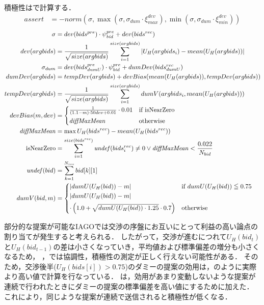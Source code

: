 積極性はで計算する．
\begin{align}
    assert &= -norm \left(\sigma, \max \left(\sigma, \sigma_{dum} \cdot \xi_{max}^{dev}\right), \min \left(\sigma, \sigma_{dum} \cdot \xi_{min}^{dev}\right) \right) \label{eq:assertiveness} 
\end{align}
\begin{align}
    \sigma &= dev(bids^{pre}) \cdot \psi_{\mathit{bid}}^{pre} + dev(bids^{rec}) \nonumber \\
    dev(argbids) &= \frac{1}{\sqrt{size(argbids)}}\sum_{i = 1}^{size(argbids)} |U_H(argbids_i) - mean(U_H(argbids))| \nonumber \\
    \sigma_{dum} &= dev(bids_{dumU}^{pre}) \cdot \psi_{\mathit{bid}}^{pre} + dumDev(bids_{dumU}^{rec}) \nonumber \\
    dumDev(argbids) &= tempDev(argbids) + devBias(mean(U_H(argbids)), tempDev(argbids)) \nonumber \\
    tempDev(argbids) &= \frac{1}{\sqrt{size(argbids)}}\sum_{i = 1}^{size(argbids)} dumV(argbids_i, mean(U_H(argbids))) \nonumber \\
    devBias(m, dev) &= 
    \begin{cases*}
        \frac{1}{(1.1 - m) \cdot 50dev + 0.01} \cdot 0.01 & if isNearZero \\
        \mathit{diffMaxMean} & otherwise 
    \end{cases*} \label{eq:devBias} \\
    \mathit{diffMaxMean} &= \max U_H(bids^{rec}) - mean(U_H(bids^{rec})) \nonumber \\
    {\rm isNearZero} &= \sum_{i = 1}^{size(bids^{rec})}\mathit{undef}(bids^{rec}_i) \neq 0 \vee \mathit{diffMaxMean} < \frac{0.022}{N_{bid}} \nonumber \\
    \mathit{undef}(bid) &= \sum_{k = 1}^{N_{iss}} bid[k][1] \nonumber \\
    dumV(bid, m) &=
    \begin{cases*}
        |dumU(U_H(bid)) - m| & if $dumU(U_H(bid)) \leqq 0.75$ \\
        |dumU(U_H(bid)) - m| \\
        \cdot \left( 1.0 + \sqrt{dumU(U_H(bid)) \cdot 1.25} \cdot 0.7 \right) & otherwise 
    \end{cases*} \label{eq:dummyV}
\end{align}

部分的な提案が可能なIAGOでは交渉の序盤にお互いにとって利益の高い論点の割り当てが発生すると考えられる．
したがって，交渉が進むにつれて$U_H(bid_t)$と$U_H(bid_{t-1})$の差は小さくなっていき，平均値および標準偏差の増分も小さくなるため，
，では協調性，積極性の測定が正しく行えない可能性がある．
そのため，交渉後半($U_H(bids[i]) > 0.75$)のダミーの提案の効用は，のように実際より高い値で計算を行なっている．
は，効用があまり変動しないような提案が連続で行われたときにダミーの提案の標準偏差を高い値にするために加えた．
これにより，同じような提案が連続で送信されると積極性が低くなる．

